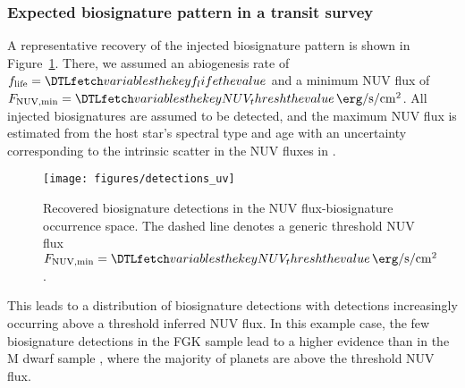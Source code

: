 \documentclass[twocolumn,twocolappendix,linenumbers]{aastex631}
\begin{document}
\subsubsection{Expected biosignature pattern in a transit survey}
A representative recovery of the injected biosignature pattern is shown in Figure~\ref{fig:detections_uv}.
There, we assumed an abiogenesis rate of $f_\mathrm{life} = \var{f_life}$ and a minimum \gls{NUV} flux of $F_\mathrm{NUV, min} = \var{NUV_thresh}\,\SI{}{\erg\per\second\per\centi\meter\squared}$.
All injected biosignatures are assumed to be detected, and the maximum \gls{NUV} flux is estimated from the host star's spectral type and age with an uncertainty corresponding to the intrinsic scatter in the \gls{NUV} fluxes in \citet{Richey-Yowell2023}.
\begin{figure*}
    \begin{centering}
        \texttt{[image: figures/detections\_uv]}
        \caption{Recovered biosignature detections in the \gls{NUV} flux-biosignature occurrence space. The dashed line denotes a generic threshold \gls{NUV} flux $F_\mathrm{NUV, min} = \var{NUV_thresh}\,\SI{}{\erg\per\second\per\centi\meter\squared}$.}
        \label{fig:detections_uv}
    \end{centering}
\end{figure*}
This leads to a distribution of biosignature detections with detections increasingly occurring above a threshold inferred NUV flux.
In this example case, the few biosignature detections in the FGK sample lead to a higher evidence %
than in the M dwarf sample%
, where the majority of planets are above the threshold \gls{NUV} flux.
\end{document}
